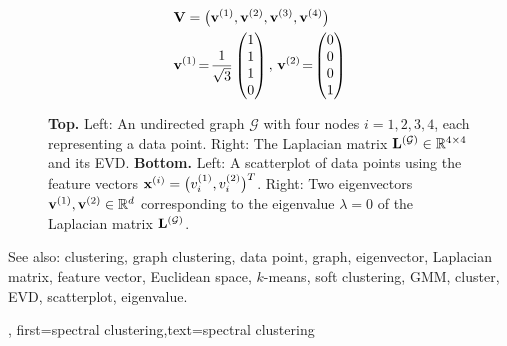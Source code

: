 {{\begin{figure}[H]
\begin{center}
\begin{minipage}{0.4\textwidth}
				\end{minipage}
				\vspace*{20mm}\\
				  \begin{minipage}{0.4\textwidth}
				\end{minipage} 
    		\begin{minipage}{0.4\textwidth}
										\begin{align}
											& \mathbf{V} = \big( {\bf v}^{(1)},{\bf v}^{(2)},{\bf v}^{(3)},{\bf v}^{(4)} \big) \nonumber \\
											&	\mathbf{v}^{(1)}\!=\!\frac{1}{\sqrt{3}} \begin{pmatrix} 1 \\ 1 \\ 1 \\ 0 \end{pmatrix}, \,
												\mathbf{v}^{(2)}\!=\!\begin{pmatrix} 0 \\ 0 \\ 0 \\ 1 \end{pmatrix} \nonumber 
												\end{align}
				\end{minipage} 
				\caption{\label{fig_lap_mtx_specclustering_dict} {\bf Top.} Left: An undirected graph 
					$\mathcal{G}$ with four nodes $i=1,2,3,4$, each representing a data point. Right: The Laplacian matrix 
					${\bf L}^{(\mathcal{G})}  \in \mathbb{R}^{4 \times 4}$ and its EVD. 
					{\bf Bottom.} Left: A scatterplot of data points using the feature vectors 
					${\bf x}^{(i)} = \big( v^{(1)}_{i},v^{(2)}_{i} \big)^{T}$. 
					Right: Two eigenvectors ${\bf v}^{(1)},{\bf v}^{(2)} \in \mathbb{R}^{d}$ 
					corresponding to the eigenvalue $\lambda=0$ of the Laplacian matrix ${\bf L}^{(\mathcal{G})}$. 
					} 
			\end{center}
		\end{figure}
		See also: clustering, graph clustering, data point, graph, eigenvector, Laplacian matrix, feature vector, Euclidean space, $k$-means, soft clustering, GMM, cluster, EVD, scatterplot, eigenvalue.
	\newpage}, 
	first={spectral clustering},text={spectral clustering} 
}

